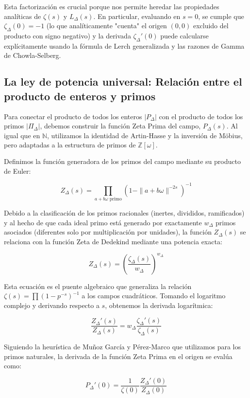 Esta factorización es crucial porque nos permite heredar las propiedades analíticas de $\zeta(s)$ y $L_\Delta(s)$. En particular, evaluando en $s=0$, se cumple que $\zeta_\Delta(0) = -1$ (lo que analíticamente "cuenta" el origen $(0,0)$ excluido del producto con signo negativo) y la derivada $\zeta_\Delta'(0)$ puede calcularse explícitamente usando la fórmula de Lerch generalizada y las razones de Gamma de Chowla-Selberg.

\subsection{La ley de potencia universal: Relación entre el producto de enteros y primos}

Para conectar el producto de todos los enteros $|P_\Delta|$ con el producto de todos los primos $|\Pi_\Delta|$, debemos construir la función Zeta Prima del campo, $P_\Delta(s)$. Al igual que en $\mathbb{N}$, utilizamos la identidad de Artin-Hasse y la inversión de Möbius, pero adaptadas a la estructura de primos de $\mathbb{Z}[\omega]$.

Definimos la función generadora de los primos del campo mediante su producto de Euler:

$$ Z_\Delta(s) = \prod_{a+b\omega \text{ primo}} \left(1 - \|a+b\omega\|^{-2s}\right)^{-1} $$

Debido a la clasificación de los primos racionales (inertes, divididos, ramificados) y al hecho de que cada ideal primo está generado por exactamente $w_\Delta$ primos asociados (diferentes solo por multiplicación por unidades), la función $Z_\Delta(s)$ se relaciona con la función Zeta de Dedekind mediante una potencia exacta:

$$ Z_\Delta(s) = \left( \frac{\zeta_\Delta(s)}{w_\Delta} \right)^{w_\Delta} $$

Esta ecuación es el puente algebraico que generaliza la relación $\zeta(s) = \prod (1-p^{-s})^{-1}$ a los campos cuadráticos. Tomando el logaritmo complejo y derivando respecto a $s$, obtenemos la derivada logarítmica:

$$ \frac{Z_\Delta'(s)}{Z_\Delta(s)} = w_\Delta \frac{\zeta_\Delta'(s)}{\zeta_\Delta(s)} $$

Siguiendo la heurística de Muñoz García y Pérez-Marco que utilizamos para los primos naturales, la derivada de la función Zeta Prima en el origen se evalúa como:

$$ P_\Delta'(0) = \frac{1}{\zeta(0)} \frac{Z_\Delta'(0)}{Z_\Delta(0)} $$

